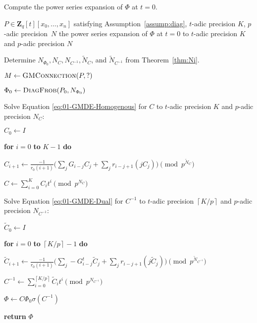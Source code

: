 \documentclass[a4paper,11pt]{article}
\numberwithin{equation}{section}
\providecommand{\ceil}[1]{\left\lceil#1\right\rceil}   %
\newcommand{\ZZ}{\mathbf{Z}} %
\theoremstyle{definition}
\begin{document}
\begin{algorithm}
\caption{Compute the power series expansion of $\Phi$ at $t=0$.}
\label{alg:expansion}
\begin{algorithmic}
\vspace{1mm}
\Require $P \in \ZZ_q[t][x_0,\dotsc,x_n]$ satisfying Assumption~\ref{assump:diag}, $t$-adic precision $K$, $p$-adic precision~$N$
\Ensure  the power series expansion of $\Phi$ at $t=0$ to $t$-adic precision $K$ and $p$-adic precision $N$
\State \begin{compactenum}[{\hspace{6pt}} 1.] \vspace{-1.24em}
\item Determine $N_{\Phi_0},N_C,N_{C^{-1}},\tilde{N}_C$, and $\tilde{N}_{C^{-1}}$ from Theorem~\ref{thm:Ni}.
\item $M \gets \textsc{GMConnection}(P,?)$
\item $\Phi_0 \gets \textsc{DiagFrob}(P_0,N_{\Phi_0})$
\item Solve Equation \eqref{eq:01-GMDE-Homogenous} for $C$ to $t$-adic precision $K$ and $p$-adic precision $N_{C}$:
\begin{compactenum}[a.] 
\item[] $C_0 \gets I$
\item[] \textbf{for} $i=0$ \textbf{to} $K-1$ \textbf{do} 
\item[] \hspace{0.6em} $C_{i+1} \gets \frac{-1}{r_0 (i+1)} \biggl(\sum_j G_{i-j} C_j + \sum_j r_{i-j+1} (j C_j) \biggr) \pmod{p^{\tilde{N}_C}}$
\item[] $C \gets \sum_{i=0}^K C_i t^i \pmod{p^{N_C}}$
\end{compactenum}
\item Solve Equation \eqref{eq:01-GMDE-Dual} for $C^{-1}$ to $t$-adic precision $\ceil{K/p}$ and $p$-adic precision $N_{C^{-1}}$:
\begin{compactenum}[a.]
\item[] $\tilde{C}_0 \gets I$
\item[] \textbf{for} $i=0$ \textbf{to} $\ceil{K/p}-1$ \textbf{do}
\item[] \hspace{0.6em} $\tilde{C}_{i+1} \gets  \frac{-1}{r_0(i+1)} \biggl(\sum_j -G_{i-j}^t \tilde{C}_j + \sum_j r_{i-j+1} (j \tilde{C}_j) \biggr) \pmod{p^{\tilde{N}_{C^{-1}}}}$
\item[] $C^{-1} \gets \sum_{i=0}^{\ceil{K/p}} \tilde{C}_i t^{i} \pmod{p^{N_{C^{-1}}}}$
\end{compactenum}
\item $\Phi \gets C \Phi_0 \sigma(C^{-1})$
\item \textbf{return} $\Phi$
\end{compactenum}
\EndProcedure
\end{algorithmic}
\end{algorithm}
\end{document}
